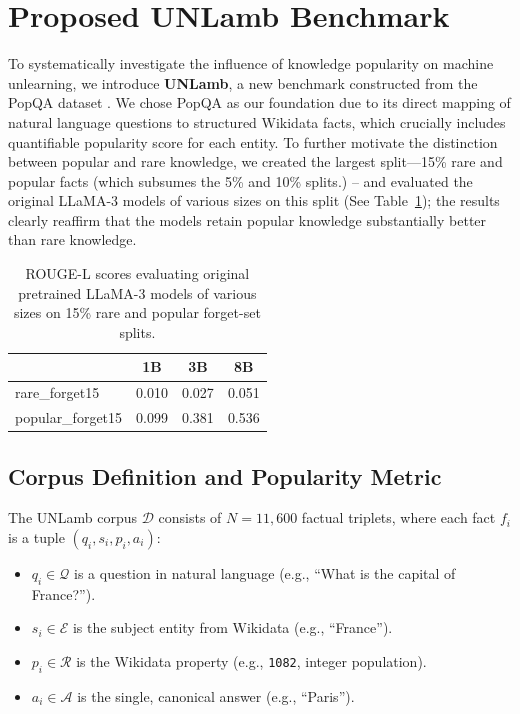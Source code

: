 \section{Proposed UNLamb Benchmark}
\label{sec:benchmark}

To systematically investigate the influence of knowledge popularity on machine unlearning, we introduce \textbf{UNLamb}, a new benchmark constructed from the PopQA dataset \cite{mallen2023not}. We chose PopQA as our foundation due to its direct mapping of natural language questions to structured Wikidata facts, which crucially includes quantifiable popularity score for each entity.
To further motivate the distinction between popular and rare knowledge, we created the largest split—15\% rare and popular facts (which subsumes the 5\% and 10\% splits.) -- and evaluated the original LLaMA-3 models of various sizes on this split (See Table~\ref{tab:orig_forget15_by_size}); the results clearly reaffirm that the models retain popular knowledge substantially better than rare knowledge.


\begin{table}[h!t]
  \centering
  \small
  \setlength{\tabcolsep}{6pt}
  \begin{tabular}{|l|c|c|c|}
    \hline
     & \textbf{1B} & \textbf{3B} & \textbf{8B} \\ 
    \hline
    rare\_forget15 & 0.010 & 0.027 & 0.051 \\
    \hline
    popular\_forget15 & 0.099 & 0.381 & 0.536 \\
    \hline
  \end{tabular}
  \caption{ROUGE-L scores evaluating original pretrained LLaMA-3 models of various sizes on 15\% rare and popular forget-set splits.}
  \label{tab:orig_forget15_by_size}
\end{table}






\subsection{Corpus Definition and Popularity Metric}

The UNLamb corpus $\mathcal{D}$ consists of $N=11,600$ factual triplets, where each fact $f_i$ is a tuple $(q_i, s_i, p_i, a_i)$:
\begin{itemize}
    \item $q_i \in \mathcal{Q}$ is a question in natural language (e.g., \enquote{What is the capital of France?}).
    \item $s_i \in \mathcal{E}$ is the subject entity from Wikidata (e.g., \enquote{France}).
    \item $p_i \in \mathcal{R}$ is the Wikidata property (e.g., \texttt{1082}, integer population).
    \item $a_i \in \mathcal{A}$ is the single, canonical answer (e.g., \enquote{Paris}).
\end{itemize}


